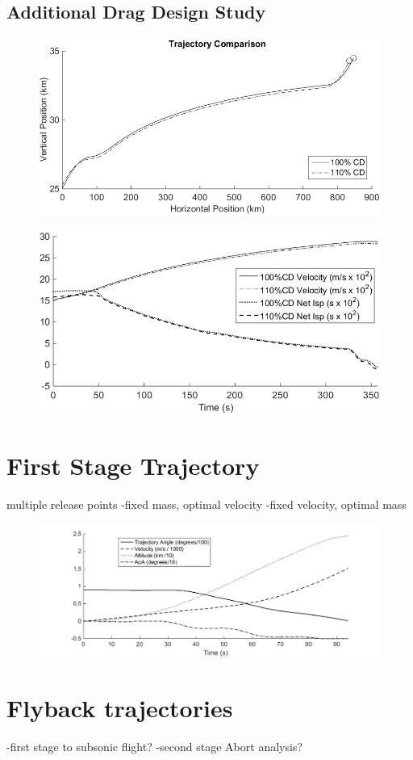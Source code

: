 \subsection{Additional Drag Design Study}
\begin{figure}
\centering
\includegraphics[width=0.7\linewidth]{figures/5_Ascent/DragComparisonTraj}
\caption{}
\label{fig:DragComparisonTraj}
\end{figure}
\begin{figure}
\centering
\includegraphics[width=0.7\linewidth]{figures/5_Ascent/DragComparisonOther}
\caption{}
\label{fig:DragComparisonOther}
\end{figure}

\section{First Stage Trajectory}
multiple release points
-fixed mass, optimal velocity
-fixed velocity, optimal mass


\begin{figure}
\centering
\includegraphics[width=0.7\linewidth]{figures/5_Ascent/FirstStage}
\caption{}
\label{fig:FirstStage}
\end{figure}


\section{Flyback trajectories }

-first stage to subsonic flight? 
-second stage
Abort analysis?